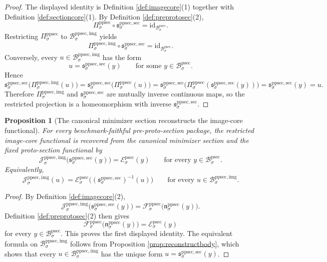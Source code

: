 \documentclass[11pt]{article}
\newcommand{\ProtoSectionBody}[1]{\mathcal B_{#1}^{\mathrm{psec}}}
\newcommand{\ProtoSectionFunctional}[1]{\mathscr E_{#1}^{\mathrm{psec}}}
\newcommand{\PreProtoSectionProj}[1]{\Pi_{#1}^{\mathrm{ppsec}}}
\newcommand{\PreProtoSectionProtoMin}[1]{\mathfrak n_{#1}^{\mathrm{ppsec}}}
\newcommand{\PreProtoSectionFunctional}[1]{\mathscr F_{#1}^{\mathrm{ppsec}}}
\newcommand{\PreProtoSectionImgBody}[1]{\mathcal B_{#1}^{\mathrm{ppsec,img}}}
\newcommand{\PreProtoSectionImgProj}[1]{\Pi_{#1}^{\mathrm{ppsec,img}}}
\newcommand{\PreProtoSectionImgFunctional}[1]{\mathscr J_{#1}^{\mathrm{ppsec,img}}}
\newcommand{\PreProtoSectionMinSection}[1]{\mathfrak s_{#1}^{\mathrm{ppsec,sec}}}
\newtheorem{proposition}{Proposition}
\begin{document}
\begin{proof}
The displayed identity is Definition \ref{def:imagecore}(1) together with Definition \ref{def:sectioncore}(1). By Definition \ref{def:preprotosec}(2),
\[
\PreProtoSectionProj{\sigma}\circ\PreProtoSectionMinSection{\sigma}
=
\mathrm{id}_{\ProtoSectionBody{\sigma}}.
\]
Restricting \(\PreProtoSectionProj{\sigma}\) to \(\PreProtoSectionImgBody{\sigma}\) yields
\[
\PreProtoSectionImgProj{\sigma}\circ\PreProtoSectionMinSection{\sigma}
=
\mathrm{id}_{\ProtoSectionBody{\sigma}}.
\]
Conversely, every \(u\in\PreProtoSectionImgBody{\sigma}\) has the form
\[
u=\PreProtoSectionMinSection{\sigma}(y)
\qquad
\text{for some }
y\in\ProtoSectionBody{\sigma}.
\]
Hence
\[
\PreProtoSectionMinSection{\sigma}\bigl(\PreProtoSectionImgProj{\sigma}(u)\bigr)
=
\PreProtoSectionMinSection{\sigma}\bigl(\PreProtoSectionProj{\sigma}(u)\bigr)
=
\PreProtoSectionMinSection{\sigma}\bigl(\PreProtoSectionProj{\sigma}(\PreProtoSectionMinSection{\sigma}(y))\bigr)
=
\PreProtoSectionMinSection{\sigma}(y)
=
u.
\]
Therefore \(\PreProtoSectionImgProj{\sigma}\) and \(\PreProtoSectionMinSection{\sigma}\) are mutually inverse continuous maps, so the restricted projection is a homeomorphism with inverse \(\PreProtoSectionMinSection{\sigma}\).
\end{proof}

\begin{proposition}[The canonical minimizer section reconstructs the image-core functional]
\label{prop:reconstructfunctional}
For every benchmark-faithful pre-proto-section package, the restricted image-core functional is recovered from the canonical minimizer section and the fixed proto-section functional by
\[
\PreProtoSectionImgFunctional{\sigma}\bigl(\PreProtoSectionMinSection{\sigma}(y)\bigr)
=
\ProtoSectionFunctional{\sigma}(y)
\qquad
\text{for every }y\in\ProtoSectionBody{\sigma}.
\]
Equivalently,
\[
\PreProtoSectionImgFunctional{\sigma}(u)
=
\ProtoSectionFunctional{\sigma}\bigl((\PreProtoSectionMinSection{\sigma})^{-1}(u)\bigr)
\qquad
\text{for every }u\in\PreProtoSectionImgBody{\sigma}.
\]
\end{proposition}

\begin{proof}
By Definition \ref{def:imagecore}(2),
\[
\PreProtoSectionImgFunctional{\sigma}\bigl(\PreProtoSectionMinSection{\sigma}(y)\bigr)
=
\PreProtoSectionFunctional{\sigma}\bigl(\PreProtoSectionProtoMin{\sigma}(y)\bigr).
\]
Definition \ref{def:preprotosec}(2) then gives
\[
\PreProtoSectionFunctional{\sigma}\bigl(\PreProtoSectionProtoMin{\sigma}(y)\bigr)
=
\ProtoSectionFunctional{\sigma}(y)
\]
for every \(y\in\ProtoSectionBody{\sigma}\). This proves the first displayed identity. The equivalent formula on \(\PreProtoSectionImgBody{\sigma}\) follows from Proposition \ref{prop:reconstructbody}, which shows that every \(u\in\PreProtoSectionImgBody{\sigma}\) has the unique form \(u=\PreProtoSectionMinSection{\sigma}(y)\).
\end{proof}
\end{document}
